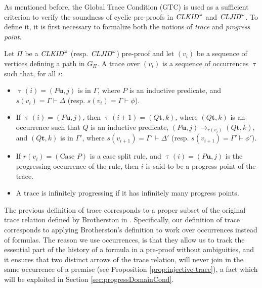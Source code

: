As mentioned before, the Global Trace Condition (GTC) is used as a sufficient criterion to verify the soundness of cyclic pre-proofs in $\textit{CLKID}^\omega$ and $\textit{CLJID}^\omega$. To define it, it is first necessary to formalize both the notions of \emph{trace} and \emph{progress point}. 

\begin{definition}
    \label{def:traceCyclic}
    Let $\Pi$ be a $\textit{CLKID}^\omega$ (resp. $\textit{CLJID}^\omega$) pre-proof and let $(v_i)$ be a sequence of vertices defining a path in $G_{\Pi}$. A trace over $(v_i)$ is a sequence of occurrences $\uptau$ such that, for all $i$:

    \begin{itemize}
          \item $\uptau(i) = (P\mathbf{u},j)$ is in $\Gamma$, where $P$ is an inductive predicate, and $s(v_i) = \Gamma \vdash \Delta$ (resp. $s(v_i) = \Gamma \vdash \phi$).

          \item If $\uptau(i) = (P\mathbf{u},j)$, then $\uptau(i+1) = (Q\mathbf{t},k)$, where $(Q\mathbf{t},k)$ is an occurrence such that $Q$ is an inductive predicate, $(P\mathbf{u},j) \rightarrow_{r(v_i)} (Q\mathbf{t},k)$, and $(Q\mathbf{t},k)$ is in $\Gamma'$, where $s(v_{i+1}) = \Gamma' \vdash \Delta'$ (resp. $s(v_{i+1}) = \Gamma' \vdash \phi'$).

          \item If $r(v_i) = (\text{Case } P)$ is a case split rule, and $\uptau(i) = (P\mathbf{u},j)$ is the progressing occurrence of the rule, then $i$ is said to be a progress point of the trace.
          \item A trace is infinitely progressing if it has infinitely many progress points.
    \end{itemize}  

\end{definition}

\begin{remark}
    \label{rem:traceDef}
    The previous definition of trace corresponds to a proper subset of the original trace relation defined by Brotherston in \cite[Definition 4.2.3]{Brotherston1}. Specifically, our definition of trace corresponds to applying Brotherston's definition to work over occurrences instead of formulas. The reason we use occurrences, is that they allow us to track the essential part of the history of a formula in a pre-proof without ambiguities, and it ensures that two distinct arrows of the trace relation, will never join in the same occurrence of a premise (see Proposition \ref{prop:injective-trace}), a fact which will be exploited in Section \ref{sec:progressDomainCond}.
\end{remark}  

